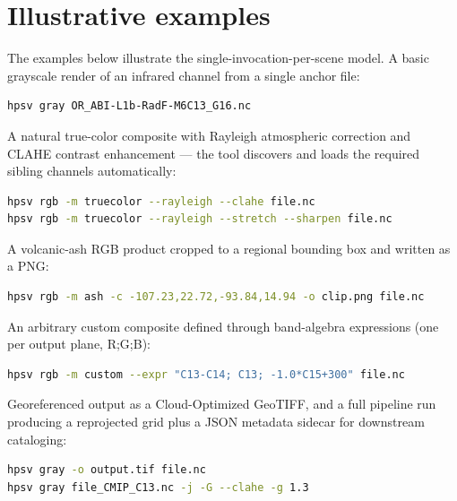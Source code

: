 \documentclass[preprint,12pt]{elsarticle}
\begin{document}
\section{Illustrative examples}
\label{sec:examples}

The examples below illustrate the single-invocation-per-scene model. A basic
grayscale render of an infrared channel from a single anchor file:

\begin{lstlisting}[language=bash,caption={Grayscale render of an anchor file.}]
hpsv gray OR_ABI-L1b-RadF-M6C13_G16.nc
\end{lstlisting}

A natural true-color composite with Rayleigh atmospheric correction and CLAHE
contrast enhancement --- the tool discovers and loads the required sibling
channels automatically:

\begin{lstlisting}[language=bash,caption={True-color RGB with corrections.}]
hpsv rgb -m truecolor --rayleigh --clahe file.nc
hpsv rgb -m truecolor --rayleigh --stretch --sharpen file.nc
\end{lstlisting}

A volcanic-ash RGB product cropped to a regional bounding box and written as a
PNG:

\begin{lstlisting}[language=bash,caption={Regional volcanic-ash product.}]
hpsv rgb -m ash -c -107.23,22.72,-93.84,14.94 -o clip.png file.nc
\end{lstlisting}

An arbitrary custom composite defined through band-algebra expressions
(one per output plane, R;G;B):

\begin{lstlisting}[language=bash,caption={Custom band-algebra composite.}]
hpsv rgb -m custom --expr "C13-C14; C13; -1.0*C15+300" file.nc
\end{lstlisting}

Georeferenced output as a Cloud-Optimized GeoTIFF, and a full pipeline run
producing a reprojected grid plus a JSON metadata sidecar for downstream
cataloging:

\begin{lstlisting}[language=bash,caption={GeoTIFF output and JSON sidecar.}]
hpsv gray -o output.tif file.nc
hpsv gray file_CMIP_C13.nc -j -G --clahe -g 1.3
\end{lstlisting}
\end{document}
